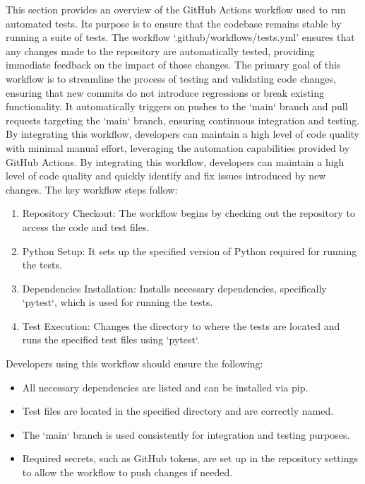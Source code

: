 This section provides an overview of the GitHub Actions workflow used to run automated tests. Its purpose is to ensure that the codebase remains stable by running a suite of tests. The workflow `.github/workflows/tests.yml' ensures that any changes made to the repository are automatically tested, providing immediate feedback on the impact of those changes. The primary goal of this workflow is to streamline the process of testing and validating code changes, ensuring that new commits do not introduce regressions or break existing functionality. It automatically triggers on pushes to the `main` branch and pull requests targeting the `main` branch, ensuring continuous integration and testing. By integrating this workflow, developers can maintain a high level of code quality with minimal manual effort, leveraging the automation capabilities provided by GitHub Actions. By integrating this workflow, developers can maintain a high level of code quality and quickly identify and fix issues introduced by new changes. The key workflow steps follow:

\begin{enumerate}
\item Repository Checkout: The workflow begins by checking out the repository to access the code and test files.
\item Python Setup: It sets up the specified version of Python required for running the tests.
\item Dependencies Installation: Installs necessary dependencies, specifically `pytest`, which is used for running the tests.
\item Test Execution: Changes the directory to where the tests are located and runs the specified test files using `pytest`.
\end{enumerate}

Developers using this workflow should ensure the following:

\begin{itemize}
\item All necessary dependencies are listed and can be installed via pip.
\item Test files are located in the specified directory and are correctly named.
\item The `main` branch is used consistently for integration and testing purposes.
\item Required secrets, such as GitHub tokens, are set up in the repository settings to allow the workflow to push changes if needed.
\end{itemize}





